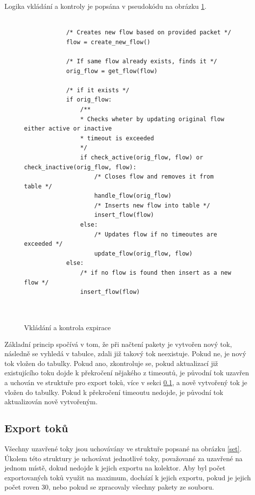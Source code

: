 \documentclass[11pt, a4paper, hidelinks]{article}[08.10.2023]
\begin{document}
    Logika vkládání a kontroly je popsána v pseudokódu na obrázku \ref{pseudo}.

     \begin{figure}[H]
        \centering
        \begin{lstlisting}[style=CStyle]

            /* Creates new flow based on provided packet */
            flow = create_new_flow()

            /* If same flow already exists, finds it */
            orig_flow = get_flow(flow)

            /* if it exists */
            if orig_flow: 
                /**
                * Checks wheter by updating original flow either active or inactive
                * timeout is exceeded
                */
                if check_active(orig_flow, flow) or check_inactive(orig_flow, flow):
                    /* Closes flow and removes it from table */
                    handle_flow(orig_flow)
                    /* Inserts new flow into table */
                    insert_flow(flow)
                else:
                    /* Updates flow if no timeoutes are exceeded */
                    update_flow(orig_flow, flow)
            else:
                /* if no flow is found then insert as a new flow */
                insert_flow(flow)

            
        \end{lstlisting}
        \caption{Vkládání a kontrola expirace}
        \label{pseudo}
    \end{figure}
    Základní princip spočívá v tom, že při načtení pakety je vytvořen nový tok, následně se vyhledá v tabulce, zdali již takový tok neexistuje. Pokud ne, je nový tok vložen do tabulky. Pokud ano, zkontroluje se, pokud aktualizací již existujícího toku dojde k překročení nějakého z timeoutů, je původní tok uzavřen a uchován ve struktuře pro export toků, více v sekci \ref{export}, a nově vytvořený tok je vložen do tabulky. Pokud k překročení timeoutu nedojde, je původní tok aktualizován nově vytvořeným.
    
    \subsection{Export toků}\label{export}
        Všechny uzavřené toky jsou uchovávány ve struktuře popsané na obrázku \ref{set}. Úkolem této struktury je uchovávat jednotlivé toky, považované za uzavřené na jednom místě, dokud nedojde k jejich exportu na kolektor. Aby byl počet exportovaných toků využit na maximum, dochází k jejich exportu, pokud je jejich počet roven 30, nebo pokud se zpracovaly všechny pakety ze souboru. 
\end{document}
